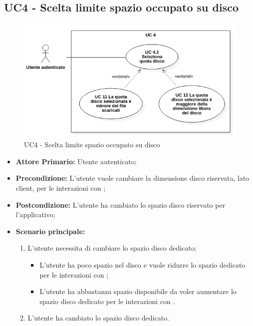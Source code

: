 \subsection{UC4 - Scelta limite spazio occupato su disco}
\label{UC4}
\begin{figure}[H]
    \centering
    \includegraphics[scale = 0.5]{components/img/UC4.png}
    \caption{UC4 - Scelta limite spazio occupato su disco}
\end{figure}
\begin{itemize}
\item \textbf{Attore Primario:} Utente autenticato;
\item \textbf{Precondizione:} L'utente vuole cambiare la dimensione disco riservata, lato client, per le interazioni con ;
\item \textbf{Postcondizione:} L'utente ha cambiato lo spazio disco riservato per l'applicativo;
\item \textbf{Scenario principale:}
    \begin{enumerate}
    \item L'utente necessita di cambiare lo spazio disco dedicato;
        \begin{itemize}
        \item L'utente ha poco spazio nel disco e vuole ridurre lo spazio dedicato per le interazioni con ;
        \item L'utente ha abbastanza spazio disponibile da voler aumentare lo spazio disco dedicato per le interazioni con .
        \end{itemize}
    \item L'utente ha cambiato lo spazio disco dedicato.
    \end{enumerate}
\end{itemize}
